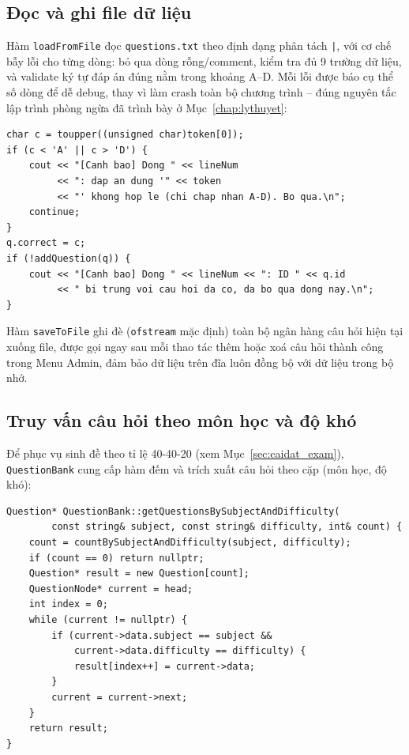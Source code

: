\documentclass[11pt]{report}
\begin{document}
\subsection{Đọc và ghi file dữ liệu}

Hàm \texttt{loadFromFile} đọc \texttt{questions.txt} theo định dạng phân tách \texttt{|}, với cơ chế bẫy lỗi cho từng dòng: bỏ qua dòng rỗng/comment, kiểm tra đủ 9 trường dữ liệu, và validate ký tự đáp án đúng nằm trong khoảng A--D. Mỗi lỗi được báo cụ thể số dòng để dễ debug, thay vì làm crash toàn bộ chương trình -- đúng nguyên tắc lập trình phòng ngừa đã trình bày ở Mục~\ref{chap:lythuyet}:

\begin{lstlisting}[caption={Trích đoạn loadFromFile với bẫy lỗi từng dòng (QuestionBank.cpp)}, label={lst:qb_load}]
char c = toupper((unsigned char)token[0]);
if (c < 'A' || c > 'D') {
    cout << "[Canh bao] Dong " << lineNum
         << ": dap an dung '" << token
         << "' khong hop le (chi chap nhan A-D). Bo qua.\n";
    continue;
}
q.correct = c;
if (!addQuestion(q)) {
    cout << "[Canh bao] Dong " << lineNum << ": ID " << q.id
         << " bi trung voi cau hoi da co, da bo qua dong nay.\n";
}
\end{lstlisting}

Hàm \texttt{saveToFile} ghi đè (\texttt{ofstream} mặc định) toàn bộ ngân hàng câu hỏi hiện tại xuống file, được gọi ngay sau mỗi thao tác thêm hoặc xoá câu hỏi thành công trong Menu Admin, đảm bảo dữ liệu trên đĩa luôn đồng bộ với dữ liệu trong bộ nhớ.

\subsection{Truy vấn câu hỏi theo môn học và độ khó}

Để phục vụ sinh đề theo tỉ lệ 40-40-20 (xem Mục~\ref{sec:caidat_exam}), \texttt{QuestionBank} cung cấp hàm đếm và trích xuất câu hỏi theo cặp (môn học, độ khó):

\begin{lstlisting}[caption={Trích xuất câu hỏi theo môn học và độ khó (QuestionBank.cpp)}, label={lst:qb_filter}]
Question* QuestionBank::getQuestionsBySubjectAndDifficulty(
        const string& subject, const string& difficulty, int& count) {
    count = countBySubjectAndDifficulty(subject, difficulty);
    if (count == 0) return nullptr;
    Question* result = new Question[count];
    QuestionNode* current = head;
    int index = 0;
    while (current != nullptr) {
        if (current->data.subject == subject &&
            current->data.difficulty == difficulty) {
            result[index++] = current->data;
        }
        current = current->next;
    }
    return result;
}
\end{lstlisting}
\end{document}
